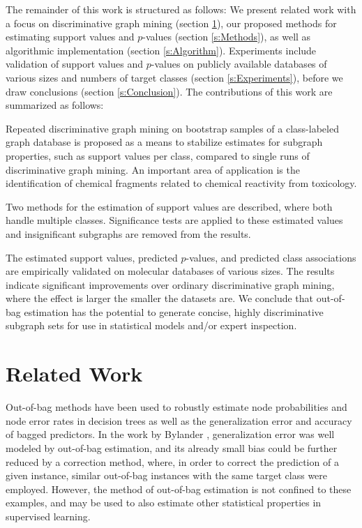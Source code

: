 \documentclass{article}
\begin{document}
The remainder of this work is structured as follows: We present related work
with a focus on discriminative graph mining (section \ref{s:relatedWork}),
our proposed methods for estimating support values and $p$-values (section
\ref{s:Methods}), as well as algorithmic implementation
(section \ref{s:Algorithm}). Experiments include validation of support
values and $p$-values on publicly available databases of
various sizes and numbers of target classes (section \ref{s:Experiments}),
before we draw conclusions (section \ref{s:Conclusion}).
The contributions of this work are summarized as follows:
\begin{itemize*}
  \item Repeated discriminative graph mining on bootstrap samples of a
    class-labeled graph database is proposed as a means to stabilize estimates
    for subgraph properties, such as support values per class, compared to
    single runs of discriminative graph mining. An important area of
    application is the identification of chemical fragments related to chemical
    reactivity from toxicology.
  \item Two methods for the estimation of support values are described, where both
    handle multiple classes. Significance tests are applied to these
    estimated values and insignificant subgraphs are removed from the results.  
  \item The estimated support values, predicted $p$-values, and predicted class
    associations are empirically validated on molecular databases of various
    sizes.  The results indicate significant improvements over 
    ordinary discriminative graph mining, where the effect is larger the
    smaller the datasets are.  We conclude that out-of-bag estimation has the
    potential to generate concise, highly discriminative subgraph sets for
    use in statistical models and/or expert inspection.
\end{itemize*}


\section{Related Work}
\label{s:relatedWork}

Out-of-bag methods have been used to robustly estimate node probabilities and
node error rates in decision trees \cite{breiman96oob} as well as the
generalization error and accuracy of bagged predictors. In the work by Bylander
\cite{bylander02estimating}, generalization error was well modeled by
out-of-bag estimation, and its already small bias could be further reduced by a
correction method, where, in order to correct the prediction of a given
instance, similar out-of-bag instances with the same target class were
employed. However, the method of out-of-bag estimation is not confined to these
examples, and may be used to also estimate other statistical properties in
supervised learning.
\end{document}
